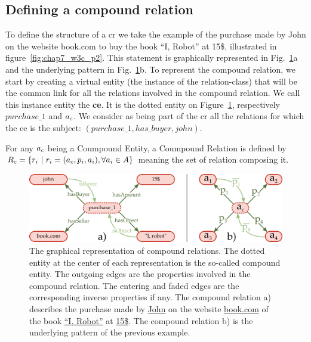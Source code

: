 \subsection{Defining a compound relation}

To define the structure of a \acrlong{cr} we take the example of the purchase made by John on the website book.com to buy the book ``I, Robot'' at 15\$, illustrated in figure~\ref{fig:chap7_w3c_p2}. This statement is graphically represented in Fig.~\ref{fig:chap7_cr}a and the underlying pattern in Fig.~\ref{fig:chap7_cr}b. To represent the compound relation, we start by creating a virtual entity (the instance of the relation-class) that will be the common link for all the relations involved in the compound relation. We call this instance entity the \textbf{\acrfull{ce}}. It is the dotted entity on Figure~\ref{fig:chap7_cr}, respectively $purchase\_1$ and $a_c$. We consider as being part of the \acrshort{cr} all the relations for which the \acrshort{ce} is the subject: $(purchase\_1, has\_buyer, john)$. 

\begin{theorem} 
\label{the:compound_relation}
For any $a_c$ being a Coumpound Entity, a Coumpound Relation is defined by $R_c = \{ r_i\ |\  r_i = (a_c, p_i, a_i), \forall a_i \in A\}$ meaning the set of relation composing it.
\end{theorem}

\begin{figure}[ht!]
\centering
\includegraphics[width=\textwidth]{figures/chapter7/CR.png}
\caption{\label{fig:chap7_cr} The graphical representation of compound relations. The dotted entity at the center of each representation is the so-called compound entity. The outgoing edges are the properties involved in the compound relation. The entering and faded edges are the corresponding inverse properties if any. The compound relation a) describes the purchase made by \underline{John} on the website \underline{book.com} of the book \underline{``I, Robot''} at \underline{15\$}. The compound relation b) is the underlying pattern of the previous example.}
\end{figure}

